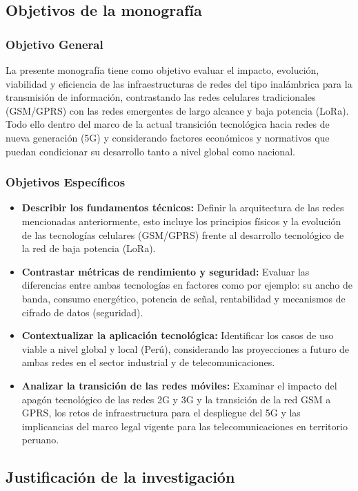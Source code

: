 \documentclass[12pt,a4paper]{article}
\begin{document}
	\subsection{Objetivos de la monografía}
	\subsubsection{Objetivo General}
	
	La presente monografía tiene como objetivo evaluar el impacto, evolución, viabilidad y eficiencia de las infraestructuras de redes del tipo inalámbrica para la transmisión de información, contrastando las redes celulares tradicionales (GSM/GPRS) con las redes emergentes de largo alcance y baja potencia (LoRa). Todo ello dentro del marco de la actual transición tecnológica hacia redes de nueva generación (5G) y considerando factores económicos y normativos que puedan condicionar su desarrollo tanto a nivel global como nacional.
	\subsubsection{Objetivos Específicos}
	\begin{itemize}
		\item \textbf{Describir los fundamentos técnicos:} Definir la arquitectura de las redes mencionadas anteriormente, esto incluye los principios físicos y la evolución de las tecnologías celulares (GSM/GPRS) frente al desarrollo tecnológico de la red de baja potencia (LoRa).
		\item \textbf{Contrastar métricas de rendimiento y seguridad:} Evaluar las diferencias  entre ambas tecnologías en factores como por ejemplo: su ancho de banda, consumo energético, potencia de señal, rentabilidad y mecanismos de cifrado de datos (seguridad).
		\item \textbf{Contextualizar la aplicación tecnológica:} Identificar los casos de uso viable a nivel global y local (Perú), considerando las proyecciones a futuro de ambas redes en el sector industrial y de telecomunicaciones.
		\item \textbf{Analizar la transición de las redes móviles:} Examinar el impacto del apagón tecnológico de las redes 2G y 3G y la transición de la red GSM a GPRS, los retos de infraestructura para el despliegue del 5G y las implicancias del marco legal vigente para las telecomunicaciones en territorio peruano.
	\end{itemize}
	\subsection{Justificación de la investigación}
\end{document}
